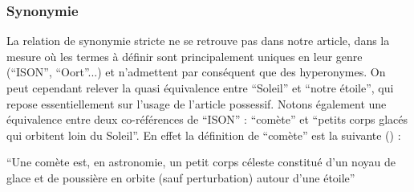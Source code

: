\documentclass[a4paper,10pt]{article}
\begin{document}
		\subsubsection{Synonymie}
			La relation de synonymie stricte ne se retrouve pas dans notre article, dans la mesure où les termes à définir sont principalement uniques en leur genre (``ISON'', ``Oort''...) et n'admettent par conséquent que des hyperonymes. On peut cependant relever la quasi équivalence entre ``Soleil'' et ``notre étoile'', qui repose essentiellement sur l'usage de l'article possessif. Notons également une équivalence entre deux co-références de ``ISON'' : ``comète'' et ``petits corps glacés qui orbitent loin du Soleil''. En effet la définition de ``comète'' est la suivante (\cite{comete}) :
			\begin{center}
				\footnotesize
				\begin{minipage}{0.7\textwidth}
					``Une comète est, en astronomie, un petit corps céleste constitué d'un noyau de glace et de poussière en orbite (sauf perturbation) autour d'une étoile''
				\end{minipage}
			\end{center}
\end{document}
